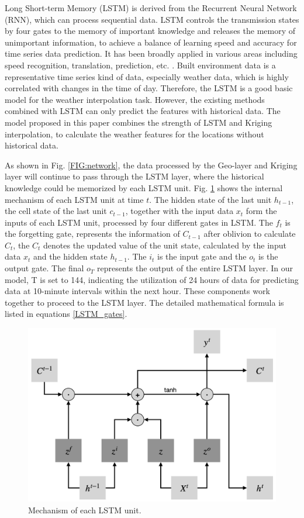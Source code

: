 \documentclass[a4paper,fleqn]{cas-sc}
\begin{document}
Long Short-term Memory (LSTM) \citep{hochreiter1997long} is derived from the Recurrent Neural Network (RNN), which can process sequential data. LSTM controls the transmission states by four gates to the memory of important knowledge and releases the memory of unimportant information, to achieve a balance of learning speed and accuracy for time series data prediction. It has been broadly applied in various areas including speed recognition, translation, prediction, etc. \citep{van2020review}. Built environment data is a representative time series kind of data, especially weather data, which is highly correlated with changes in the time of day. Therefore, the LSTM is a good basic model for the weather interpolation task. However, the existing methods combined with LSTM can only predict the features with historical data. The model proposed in this paper combines the strength of LSTM and Kriging interpolation, to calculate the weather features for the locations without historical data.

As shown in Fig. \ref{FIG:network}, the data processed by the Geo-layer and Kriging layer will continue to pass through the LSTM layer, where the historical knowledge could be memorized by each LSTM unit. Fig. \ref{FIG:Mechanism of each LSTM unit} shows the internal mechanism of each LSTM unit at time $t$. The hidden state of the last unit $h_{t-1}$, the cell state of the last unit $c_{t-1}$, together with the input data $x_t$ form the inputs of each LSTM unit, processed by four different gates in LSTM. The $f_t$ is the forgetting gate, represents the information of $C_{t-1}$ after oblivion to calculate $C_t$, the $C_t$ denotes the updated value of the unit state, calculated by the input data $x_t$ and the hidden state $h_{t-1}$. The $i_t$ is the input gate and the $o_t$ is the output gate. The final $o_T$ represents the output of the entire LSTM layer. In our model, T is set to 144, indicating the utilization of 24 hours of data for predicting data at 10-minute intervals within the next hour. These components work together to proceed to the LSTM layer. The detailed mathematical formula is listed in equations \ref{LSTM_gates}. 

\begin{figure}
	\centering
	\includegraphics[scale=0.3]{figs/lstm_unit.png}
	\caption{Mechanism of each LSTM unit.}
	\label{FIG:Mechanism of each LSTM unit}
\end{figure}
\end{document}
